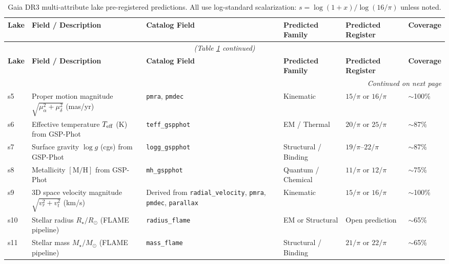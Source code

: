 \documentclass[12pt,a4paper]{article}
\begin{document}
\begin{longtable}{p{1.0cm} p{5.0cm} p{2.2cm} p{3.5cm} p{2.5cm} p{1.5cm}}
\caption{Gaia DR3 multi-attribute lake pre-registered predictions. All use
log-standard scalarization: $s = \log(1+x)/\log(16/\pi)$ unless noted.}
\label{tab:gaia_predictions}\\
\toprule
\textbf{Lake} & \textbf{Field / Description} & \textbf{Catalog Field} &
\textbf{Predicted Family} & \textbf{Predicted Register} & \textbf{Coverage}\\
\midrule
\endfirsthead
\multicolumn{6}{c}{\textit{(Table \ref{tab:gaia_predictions} continued)}}\\
\toprule
\textbf{Lake} & \textbf{Field / Description} & \textbf{Catalog Field} &
\textbf{Predicted Family} & \textbf{Predicted Register} & \textbf{Coverage}\\
\midrule
\endhead
\midrule
\multicolumn{6}{r}{\textit{Continued on next page}}\\
\endfoot
\bottomrule
\endlastfoot

s5 &
Proper motion magnitude $\sqrt{\mu_\alpha^2 + \mu_\delta^2}$ (mas/yr) &
\texttt{pmra}, \texttt{pmdec} &
Kinematic &
$15/\pi$ or $16/\pi$ &
$\sim$100\% \\[0.3em]

s6 &
Effective temperature $T_{\rm eff}$ (K) from GSP-Phot &
\texttt{teff\_gspphot} &
EM / Thermal &
$20/\pi$ or $25/\pi$ &
$\sim$87\% \\[0.3em]

s7 &
Surface gravity $\log g$ (cgs) from GSP-Phot &
\texttt{logg\_gspphot} &
Structural / Binding &
$19/\pi$--$22/\pi$ &
$\sim$87\% \\[0.3em]

s8 &
Metallicity $[\mathrm{M/H}]$ from GSP-Phot &
\texttt{mh\_gspphot} &
Quantum / Chemical &
$11/\pi$ or $12/\pi$ &
$\sim$75\% \\[0.3em]

s9 &
3D space velocity magnitude $\sqrt{v_r^2 + v_t^2}$ (km/s) &
Derived from \texttt{radial\_velocity}, \texttt{pmra}, \texttt{pmdec},
\texttt{parallax} &
Kinematic &
$15/\pi$ or $16/\pi$ &
$\sim$100\% \\[0.3em]

s10 &
Stellar radius $R_\star/R_\odot$ (FLAME pipeline) &
\texttt{radius\_flame} &
EM or Structural &
Open prediction &
$\sim$65\% \\[0.3em]

s11 &
Stellar mass $M_\star/M_\odot$ (FLAME pipeline) &
\texttt{mass\_flame} &
Structural / Binding &
$21/\pi$ or $22/\pi$ &
$\sim$65\% \\
\end{longtable}
\end{document}
